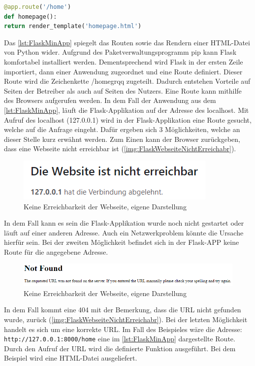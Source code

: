 \documentclass[a4paper,titlepage,halfparskip,12pt]{scrreprt}
\begin{document}
\begin{onehalfspacing}
\begin{lstlisting}[language=Python,caption=Example Listing of Flask Python,label={lst:FlaskMinApp}]
@app.route('/home')
def homepage():
return render_template('homepage.html')
\end{lstlisting}
Das \autoref{lst:FlaskMinApp} spiegelt das Routen sowie das Rendern einer \ac{HTML}-Datei von Python wider. Aufgrund des Paketverwaltungsprogramm pip kann Flask komfortabel installiert werden. Dementsprechend wird Flask in der ersten Zeile importiert, dann einer Anwendung zugeordnet und eine Route definiert. Dieser Route wird die Zeichenkette \glqq /homegrqq{} zugeteilt. Dadurch entstehen Vorteile auf Seiten der Betreiber als auch auf Seiten des Nutzers. Eine Route kann mithilfe des Browsers aufgerufen werden. In dem Fall der Anwendung aus dem \autoref{lst:FlaskMinApp}, läuft die Flask-Applikation auf der Adresse des localhost. Mit Aufruf des localhost (127.0.0.1) wird in der Flask-Applikation eine Route gesucht, welche auf die Anfrage eingeht. Dafür ergeben sich 3 Möglichkeiten, welche an dieser Stelle kurz erwähnt werden. Zum Einen kann der Browser zurückgeben, dass eine Webseite nicht erreichbar ist (\autoref{img:FlaskWebseiteNichtErreichabr}). 
\begin{figure}[h]
	\centering
	\includegraphics[scale=1.5]{images/WebseiteNichtErreichbar}
	\caption{Keine Erreichbarkeit der Webseite, eigene Darstellung}
	\label{img:FlaskWebseiteNichtErreichabr}
\end{figure}
In dem Fall kann es sein die Flask-Applikation wurde noch nicht gestartet oder läuft auf einer anderen Adresse. Auch ein Netzwerkproblem könnte die Ursache hierfür sein. Bei der zweiten Möglichkeit befindet sich in der Flask-APP keine Route für die angegebene Adresse.
\begin{figure}[h]
	\centering
	\includegraphics[scale=1.0]{images/NotFound}
	\caption{Keine Erreichbarkeit der Webseite, eigene Darstellung}
	\label{img:FlaskWebseiteNotFound}
\end{figure}
In dem Fall kommt eine 404 mit der Bemerkung, dass die URL nicht gefunden wurde, zurück (\autoref{img:FlaskWebseiteNichtErreichabr}). Bei der letzten Möglichkeit handelt es sich um eine korrekte URL. Im Fall des Beispieles wäre die Adresse: \texttt{http://127.0.0.1:8000/home} eine im \autoref{lst:FlaskMinApp} dargestellte Route. Durch den Aufruf der URL wird die definierte Funktion ausgeführt. Bei dem Beispiel wird eine HTML-Datei ausgeliefert.

\end{onehalfspacing}
\end{document}
